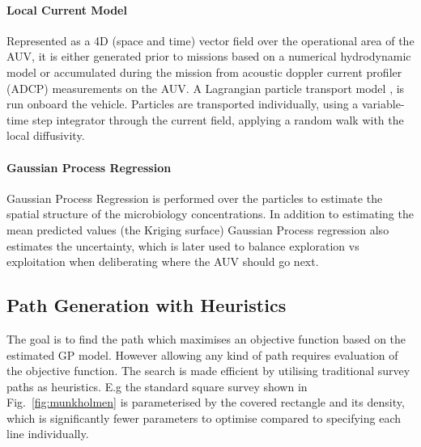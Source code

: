 \documentclass[conference]{IEEEtran}
\newcommand{\cmt}[1]{{\color{red}{#1}}}
\begin{document}
\paragraph{Local Current Model}
Represented as a 4D (space and time) vector field over the operational
area of the AUV, it is either generated prior to missions based on a
numerical hydrodynamic model
or accumulated during the mission from acoustic doppler current
profiler (ADCP) measurements on the AUV.  A Lagrangian particle
transport model \cite{Rye2006}, is run onboard the vehicle.  Particles
are transported individually, using a variable-time step
integrator %
through the current field, applying a random walk with the local
diffusivity.

\paragraph{Gaussian Process Regression} 
Gaussian Process Regression is performed over the particles to estimate the spatial structure of the microbiology concentrations.
In addition to estimating the mean predicted values (the Kriging surface)
Gaussian Process regression also estimates the uncertainty, which is
later used to balance exploration vs exploitation when deliberating
where the AUV should go next.

\subsection{Path Generation with Heuristics}
The goal is to find the path which maximises an objective function
based on the estimated GP model.  However allowing any kind of path
requires evaluation of the objective function. The search is made
efficient by utilising traditional survey paths as heuristics. E.g the
standard square survey shown in Fig.~\ref{fig:munkholmen} is
parameterised by the covered rectangle and its density, which is
significantly fewer parameters to optimise compared to specifying each
line individually.
\end{document}
